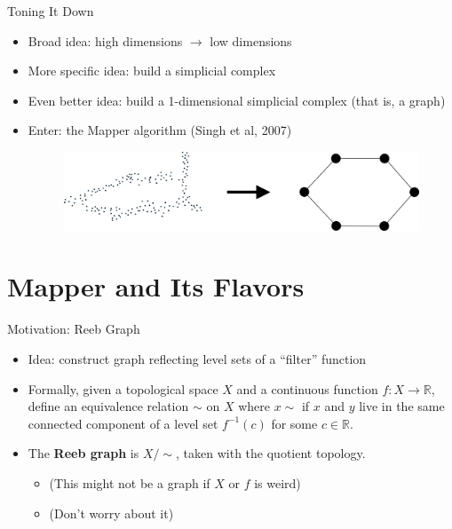 \documentclass{beamer}
\begin{document}
\begin{frame}{Toning It Down}
  \begin{itemize}
    \item Broad idea: high dimensions $\to$ low dimensions
    \item More specific idea: build a simplicial complex
    \item Even better idea: build a 1-dimensional simplicial complex (that is, a graph)
    \item Enter: the Mapper algorithm (Singh et al, 2007)
    \vspace*{.5cm}
  \begin{figure}
    \begin{center}
      \hspace*{-1cm}\includegraphics[width=1\textwidth]{datatograph.png}
    \end{center}
  \end{figure}
  \end{itemize}
\end{frame}

\section{Mapper and Its Flavors}
\begin{frame}{Motivation: Reeb Graph}
  \begin{itemize}
    \item Idea: construct graph reflecting level sets of a ``filter'' function
    \item Formally, given a topological space $X$ and a continuous function 
    $f: X\to\mathbb{R}$, define an equivalence relation $\sim$ on $X$ where $x\sim$ if $x$ and $y$ live in the same connected component of a level set $f^{-1}(c)$ for some $c\in\mathbb{R}$.
    \item The \textbf{Reeb graph} is $X/\sim$, taken with the quotient topology.
    \begin{itemize}
      \item (This might not be a graph if $X$ or $f$ is weird)
      \item (Don't worry about it)
    \end{itemize}
  \end{itemize}
\end{frame}
\end{document}

